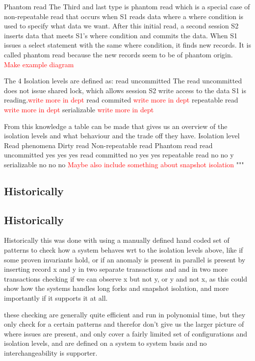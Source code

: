 \documentclass[
  a4paper,  %
  twoside,  %
  bibliography=totoc,
  headsepline,
  cleardoublepage=empty,
  parskip=half,
  draft=false
]{scrbook}
\begin{document}
Phantom read
The Third and last type is phantom read which is a special case of non-repeatable read that occurs when S1 reads data where a where condition is used to specify what data we want. After this initial read, a second session S2 inserts data that meets S1's where condition and commits the data. When S1 issues a select statement with the same where condition, it finds new records. It is called phantom read because the new records seem to be of phantom origin.
 \textcolor{red}{Make example diagram} 

The 4 Isolation levels are defined as:
read uncommitted
       The read uncommitted does not issue shared lock, which allows session S2 write access to the data S1 is reading.\textcolor{red}{write more in dept} 
 read commited
 \textcolor{red}{write more in dept} 
repeatable read
\textcolor{red}{write more in dept} 
serializable
\textcolor{red}{write more in dept} 



From this knowledge a table can be made that gives us an overview of the isolation levels and what behaviour and the trade off they have.
Isolation level	Read phenomena
Dirty read	Non-repeatable read	Phantom read
read uncommitted	yes	yes	yes
read committed	no	yes	yes
repeatable read	no	no	y
serializable	no	no	no
\textcolor{red}{Maybe also include something about snapshot isolation} 
"""

\subsection{Historically}

\subsection{Historically}

Historically this was done with using a manually defined hand coded set of patterns to check how a system behaves wrt to the isolation levels above, like if some proven invariants hold, or if an anomaly is present in parallel is present by inserting record x and y in two separate transactions and and in two more transactions checking if we can observe x but not y, or y and not x, as this could show how the systems handles long forks and snapshot isolation, and more importantly if it supports it at all.

these checking are generally quite efficient and run in polynomial time, but they only check for a certain patterns and therefor don't give us the larger picture of where issues are present, and only cover a fairly limited set of configurations and isolation levels, and are defined on a system to system basis and no interchangeability is supporter.
\end{document}
